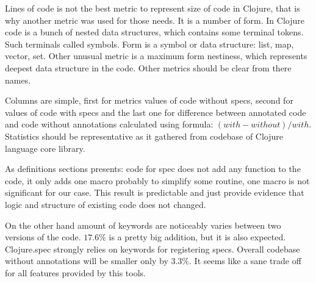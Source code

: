 Lines of code is not the best metric to represent size of code in Clojure,
that is why another metric was used for those needs. It is a number of form. In
Clojure code is a bunch of nested data structures, which contains some terminal
tokens. Such terminals called symbols. Form is a symbol or data structure: list,
map, vector, set. Other unusual metric is a maximum form nestiness, which
represents deepest data structure in the code. Other metrics should be clear
from there names.

Columns are simple, first for metrics values of code without specs, second for
values of code with specs and the last one for difference between annotated code
and code without annotations calculated using formula: $(with - without)/with$.
Statistics should be representative as it gathered from codebase of Clojure
language core library.

As definitions sections presents: code for spec does not add any function to the
code, it only adds one macro probably to simplify some routine, one macro is not
significant for our case. This result is predictable and just provide evidence
that logic and structure of existing code does not changed.

On the other hand amount of keywords are noticeably varies between two versions
of the code. $17.6\%$ is a pretty big addition, but it is also expected.
Clojure.spec strongly relies on keywords for registering specs. Overall codebase
without annotations will be smaller only by $3.3\%$. It seems like a sane trade
off for all features provided by this tools.


